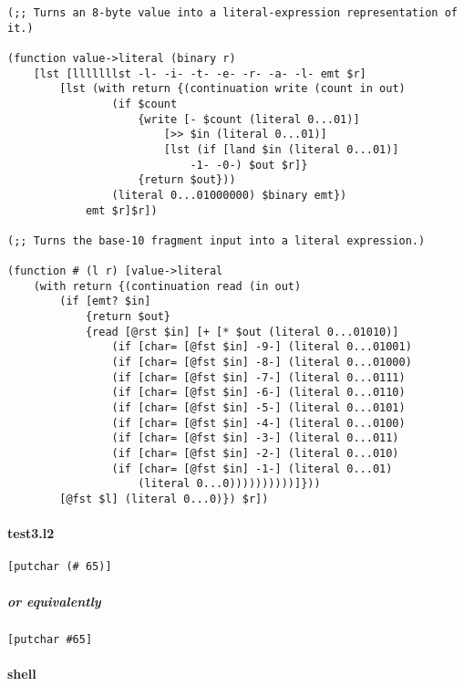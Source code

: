 \documentclass[]{article}
\let\oldparagraph\paragraph
\renewcommand{\paragraph}[1]{\oldparagraph{#1}\mbox{}}
\let\oldsubparagraph\subparagraph
\renewcommand{\subparagraph}[1]{\oldsubparagraph{#1}\mbox{}}
\begin{document}
\begin{verbatim}
(;; Turns an 8-byte value into a literal-expression representation of it.)

(function value->literal (binary r)
    [lst [lllllllst -l- -i- -t- -e- -r- -a- -l- emt $r]
        [lst (with return {(continuation write (count in out)
                (if $count
                    {write [- $count (literal 0...01)]
                        [>> $in (literal 0...01)]
                        [lst (if [land $in (literal 0...01)]
                            -1- -0-) $out $r]}
                    {return $out}))
                (literal 0...01000000) $binary emt})
            emt $r]$r])

(;; Turns the base-10 fragment input into a literal expression.)

(function # (l r) [value->literal
    (with return {(continuation read (in out)
        (if [emt? $in]
            {return $out}
            {read [@rst $in] [+ [* $out (literal 0...01010)]
                (if [char= [@fst $in] -9-] (literal 0...01001)
                (if [char= [@fst $in] -8-] (literal 0...01000)
                (if [char= [@fst $in] -7-] (literal 0...0111)
                (if [char= [@fst $in] -6-] (literal 0...0110)
                (if [char= [@fst $in] -5-] (literal 0...0101)
                (if [char= [@fst $in] -4-] (literal 0...0100)
                (if [char= [@fst $in] -3-] (literal 0...011)
                (if [char= [@fst $in] -2-] (literal 0...010)
                (if [char= [@fst $in] -1-] (literal 0...01)
                    (literal 0...0))))))))))]}))
        [@fst $l] (literal 0...0)}) $r])
\end{verbatim}

\hypertarget{test3.l2}{%
\paragraph{test3.l2}\label{test3.l2}}

\begin{verbatim}
[putchar (# 65)]
\end{verbatim}

\hypertarget{or-equivalently-1}{%
\subparagraph{or equivalently}\label{or-equivalently-1}}

\begin{verbatim}
[putchar #65]
\end{verbatim}

\hypertarget{shell-2}{%
\paragraph{shell}\label{shell-2}}
\end{document}
